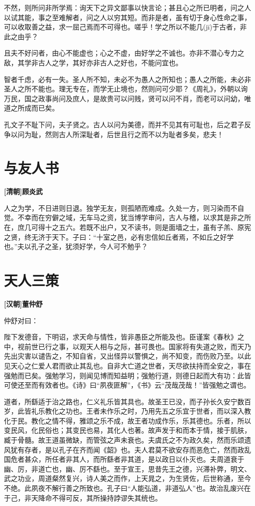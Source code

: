 \documentclass[UTF8,titlepage,oneside]{ctexbook}
\begin{document}
不然，则所问非所学焉：询天下之异文鄙事以快言论；甚且心之所已明者，问之人以试其能，事之至难解者，问之人以穷其短。而非是者，虽有切于身心性命之事，可以收取善之益，求一屈己焉而不可得也。嗟乎！学之所以不能几(jī)于古者，非此之由乎？

且夫不好问者，由心不能虚也；心之不虚，由好学之不诚也。亦非不潜心专力之敌，其学非古人之学，其好亦非古人之好也，不能问宜也。

智者千虑，必有一失。圣人所不知，未必不为愚人之所知也；愚人之所能，未必非圣人之所不能也。理无专在，而学无止境也，然则问可少耶？《周礼》，外朝以询万民，国之政事尚问及庶人，是故贵可以问贱，贤可以问不肖，而老可以问幼，唯道之所成而已矣。

孔文子不耻下问，夫子贤之。古人以问为美德，而并不见其有可耻也，后之君子反争以问为耻，然则古人所深耻者，后世且行之而不以为耻者多矣，悲夫！


\chapter*{与友人书}
\begin{center}
	\textbf{[清朝]顾炎武}
\end{center}

人之为学，不日进则日退。独学无友，则孤陋而难成。久处一方，则习染而不自觉。不幸而在穷僻之域，无车马之资，犹当博学审问，古人与稽，以求其是非之所在，庶几可得十之五六。若既不出户，又不读书，则是面墙之士，虽有子羔、原宪之贤，终无济于天下。子曰：“十室之邑，必有忠信如丘者焉，不如丘之好学也。”夫以孔子之圣，犹须好学，今人可不勉乎？


\chapter*{天人三策}
\begin{center}
	\textbf{[汉朝]董仲舒}
\end{center}

仲舒对曰：

陛下发德音，下明诏，求天命与情性，皆非愚臣之所能及也。臣谨案《春秋》之中，视前世已行之事，以观天人相与之际，甚可畏也。国家将有失道之败，而天乃先出灾害以谴告之，不知自省，又出怪异以警惧之，尚不知变，而伤败乃至。以此见天心之仁爱人君而欲止其乱也。自非大亡道之世者，天尽欲扶持而全安之，事在强勉而已矣。强勉学习，则闻见博而知益明；强勉行道，则德日起而大有功：此皆可使还至而有效者也。《诗》曰“夙夜匪解”，《书》云“茂哉茂哉！”皆强勉之谓也。

道者，所繇适于治之路也，仁义礼乐皆其具也。故圣王已没，而子孙长久安宁数百岁，此皆礼乐教化之功也。王者未作乐之时，乃用先五之乐宜于世者，而以深入教化于民。教化之情不得，雅颂之乐不成，故王者功成作乐，乐其德也。乐者，所以变民风，化民俗也；其变民也易，其化人也著。故声发于和而本于情，接于肌肤，臧于骨髓。故王道虽微缺，而管弦之声未衰也。夫虞氏之不为政久矣，然而乐颂遗风犹有存者，是以孔子在齐而闻《韶》也。夫人君莫不欲安存而恶危亡，然而政乱国危者甚众，所任者非其人，而所繇者非其道，是以政日以仆灭也。夫周道衰于幽、厉，非道亡也，幽、厉不繇也。至于宣王，思昔先王之德，兴滞补弊，明文、武之功业，周道粲然复兴，诗人美之而作，上天晁之，为生贤佐，后世称通，至今不绝。此夙夜不解行善之所致也。孔子曰“人能弘道，非道弘人”也。故治乱废兴在于己，非天降命不得可反，其所操持誖谬失其统也。
\end{document}
